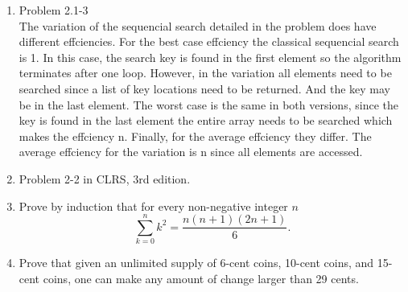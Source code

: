 \documentclass[letterpaper,11pt]{article}
\begin{document}



\begin{enumerate}
\item Problem 2.1-3 \\
The variation of the sequencial search detailed in the problem does have different effciencies. For the best case effciency the classical sequencial search is  1. In this case, the search key is found in the first element so the algorithm terminates after one loop. However, in the variation all elements need to be searched since a list of key locations need to be returned. And the key may be in the last element. The worst case is the same in both versions, since the key is found in the last element the entire array needs to be searched which makes the effciency n. Finally, for the average effciency they differ. The average effciency for the variation is n since all elements are accessed.
\item Problem 2-2 in CLRS, 3rd edition. 


\item Prove by induction that for every non-negative integer $n$
\[\sum_{k=0}^{n} k^2 = \frac{n(n+1)(2n+1)}{6}.\]
\item Prove that given an unlimited supply of 6-cent coins, 10-cent coins, and 15-cent coins, one can make any amount of change larger than 29 cents.
\end{enumerate}
\end{document}
